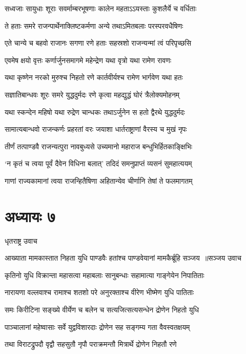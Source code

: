 \twolineshloka
{सध्वजाः सायुधाः शूराः सवर्माम्बरभूषणाः}
{कालेन महताऽऽयस्ताः कुशलैर्ये च वर्धिताः}


\twolineshloka
{ते हताः समरे राजन्पार्थेनाक्लिष्टकर्मणा}
{अन्ये तथाऽमितबलाः परस्परवधैषिणः}


\twolineshloka
{एते चान्ये च बहवो राजानः सगणा रणे}
{हताः सहस्रशो राजन्यन्मां त्वं परिपृच्छसि}


\twolineshloka
{एवमेष क्षयो वृत्तः कर्णार्जुनसमागमे}
{महेन्द्रेण यथा वृत्रो यथा रामेण रावणः}


\twolineshloka
{यथा कृष्णेन नरको मुरुश्च निहतो रणे}
{कार्तवीर्यश्च रामेण भार्गवेण यथा हतः}


\twolineshloka
{सज्ञातिबान्धवः शूरः समरे युद्धदुर्मदः}
{रणे कृत्वा महद्युद्धं घोरं त्रैलोक्यमोहनम्}


\twolineshloka
{यथा स्कन्देन महिषो यथा रुद्रेण चान्धकः}
{तथाऽर्जुनेन स हतो द्वैरथे युद्धदुर्मदः}


\twolineshloka
{सामात्यबान्धवो राजन्कर्णः प्रहरतां वरः}
{जयाशा धार्तराष्ट्राणां वैरस्य च मुखं नृपः}


\twolineshloka
{तीर्णं तत्पाण्डवै राजन्यत्पुरा नावबुध्यसे}
{उच्यमानो महाराज बन्धुभिर्हितकाङ्क्षिभिः}


\twolineshloka
{`न कृतं च त्वया पूर्वं दैवेन विधिना बलात्'}
{तदिदं समनुप्राप्तं व्यसनं सुमहात्ययम्}


\twolineshloka
{गाणां राज्यकामानां त्वया राजन्हितैषिणा}
{अहितान्येव चीर्णानि तेषां ते फलमागतम्}


\chapter{अध्यायः ७}
\twolineshloka
{धृतराष्ट्र उवाच}
{}


\threelineshloka
{आख्याता मामकास्तात निहता युधि पाण्डवैः}
{हतांश्च पाण्डवेयानां मामकैर्ब्रूहि सञ्जय ॥सञ्जय उवाच}
{}


\twolineshloka
{कृतिनो युधि विक्रान्ता महासत्वा महाबलाः}
{सानुबन्धाः सहामात्या गाङ्गेयेन निपातिताः}


\twolineshloka
{नारायणा वल्लवाश्च रामाश्च शतशो परे}
{अनुरक्ताश्च वीरेण भीष्मेण युधि पातिताः}


\twolineshloka
{समः किरीटिना सङ्ख्ये वीर्येण च बलेन च}
{सत्यजित्सत्यसन्धेन द्रोणेन निहतो युधि}


\twolineshloka
{पाञ्चालानां महेष्वासाः सर्वे युद्वविशारदाः}
{द्रोणेन सह सङ्गम्य गता वैवस्वतक्षयम्}


\twolineshloka
{तथा विराटद्रुपदौ वृद्वौ सहसुतौ नृपौ}
{पराक्रमन्तौ मित्रार्थे द्रोणेन निहतौ रणे}



